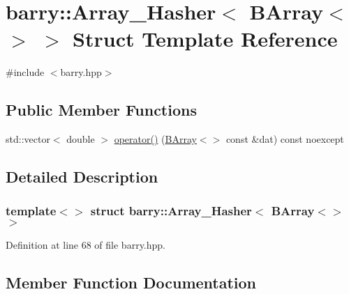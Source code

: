 \hypertarget{structbarry_1_1_array___hasher_3_01_b_array_3_4_01_4}{}\section{barry\+:\+:Array\+\_\+\+Hasher$<$ B\+Array$<$$>$ $>$ Struct Template Reference}
\label{structbarry_1_1_array___hasher_3_01_b_array_3_4_01_4}


{\ttfamily \#include $<$barry.\+hpp$>$}

\subsection*{Public Member Functions}
\begin{DoxyCompactItemize}
\item 
std\+::vector$<$ double $>$ \hyperlink{structbarry_1_1_array___hasher_3_01_b_array_3_4_01_4_a0da1aa0b03834f3c992cabce303cfe48}{operator()} (\hyperlink{classbarry_1_1_b_array}{B\+Array}$<$$>$ const \&dat) const noexcept
\end{DoxyCompactItemize}


\subsection{Detailed Description}
\subsubsection*{template$<$$>$\newline
struct barry\+::\+Array\+\_\+\+Hasher$<$ B\+Array$<$$>$ $>$}



Definition at line 68 of file barry.\+hpp.



\subsection{Member Function Documentation}
\mbox{\label{structbarry_1_1_array___hasher_3_01_b_array_3_4_01_4_a0da1aa0b03834f3c992cabce303cfe48}} 
